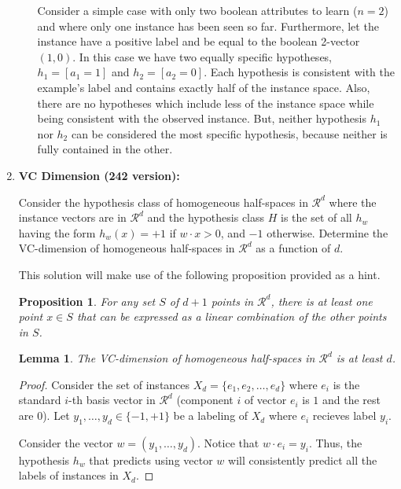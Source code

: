 \documentclass[12pt]{article}
\newtheorem{lemma}{Lemma}[section]
\newtheorem{proposition}{Proposition}[section]
\begin{document}
\begin{enumerate}
\begin{enumerate}
Consider a simple case with only two boolean attributes to learn ($n=2$)
and where only one instance has been seen so far.
Furthermore, let the instance have a positive label and be equal to the
boolean 2-vector $(1,0)$.
In this case we have two equally specific hypotheses,
$h_{1}=\left[a_{1}=1\right]$ and $h_{2}=\left[a_{2}=0\right]$.
Each hypothesis is consistent with the example's label and contains exactly
half of the instance space.
Also, there are no hypotheses which include less of the instance space while
being consistent with the observed instance.
But, neither hypothesis $h_1$ nor $h_2$ can be considered the most specific
hypothesis, because neither is fully contained in the other.
\end{enumerate}


\item \textbf{VC Dimension (242 version): }

Consider the hypothesis class of homogeneous half-spaces in $\mathcal{R}^d$ where the instance vectors are in $\mathcal{R}^d$ and the hypothesis class $H$ is the set of all $h_w$ having the form $h_w(x) = +1$ if $w \cdot x > 0$, and $-1$ otherwise.
Determine the VC-dimension of homogeneous half-spaces in $\mathcal{R}^d$ as a function of $d$.

This solution will make use of the following proposition provided as a hint.
\begin{proposition}
    \label{prop:lin-comb}
    For any set $S$ of $d+1$ points in $\mathcal{R}^d$, there is at least one point $x \in S$ that can be expressed as a linear combination of the other points in $S$.
\end{proposition}

\begin{lemma}
    The VC-dimension of homogeneous half-spaces in $\mathcal{R}^d$ is at least $d$.
\end{lemma}

\begin{proof}
    Consider the set of instances $X_d = \{e_1, e_2, \dots, e_d\}$ where $e_i$ is the standard $i$-th basis vector in $\mathcal{R}^d$ (component $i$ of vector $e_i$ is $1$ and the rest are $0$).
    Let $y_1, \dots, y_d \in \{-1,+1\}$ be a labeling of $X_d$ where $e_i$ recieves label $y_i$.

    Consider the vector $w = (y_1, \dots, y_d)$.
    Notice that $w \cdot e_i = y_i$.
    Thus, the hypothesis $h_w$ that predicts using vector $w$ will consistently predict all the labels of instances in $X_d$.


\end{proof}
\end{enumerate}
\end{document}
